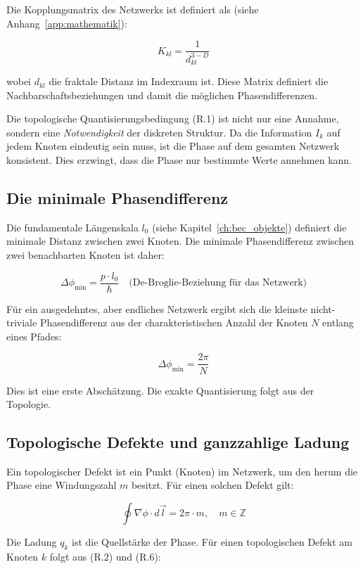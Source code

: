 Die Kopplungsmatrix des Netzwerks ist definiert als (siehe Anhang~\ref{app:mathematik}):

\[
K_{kl} = \frac{1}{d_{kl}^{3-D}}
\tag{R.3}
\]

wobei \( d_{kl} \) die fraktale Distanz im Indexraum ist. Diese Matrix definiert die Nachbarschaftsbeziehungen und damit die möglichen Phasendifferenzen.

Die topologische Quantisierungsbedingung (R.1) ist nicht nur eine Annahme, sondern eine \emph{Notwendigkeit} der diskreten Struktur. Da die Information \( I_k \) auf jedem Knoten eindeutig sein muss, ist die Phase auf dem gesamten Netzwerk konsistent. Dies erzwingt, dass die Phase nur bestimmte Werte annehmen kann.

\subsection{Die minimale Phasendifferenz}
\label{sub:phasenquantisierung_minimum}

Die fundamentale Längenskala \( l_0 \) (siehe Kapitel~\ref{ch:bec_objekte}) definiert die minimale Distanz zwischen zwei Knoten. Die minimale Phasendifferenz zwischen zwei benachbarten Knoten ist daher:

\[
\Delta \phi_{\min} = \frac{p \cdot l_0}{\hbar} \quad \text{(De-Broglie-Beziehung für das Netzwerk)}
\tag{R.4}
\]

Für ein ausgedehntes, aber endliches Netzwerk ergibt sich die kleinste nicht-triviale Phasendifferenz aus der charakteristischen Anzahl der Knoten \( N \) entlang eines Pfades:

\[
\Delta \phi_{\min} = \frac{2\pi}{N}
\tag{R.5}
\]

Dies ist eine erste Abschätzung. Die exakte Quantisierung folgt aus der Topologie.

\subsection{Topologische Defekte und ganzzahlige Ladung}
\label{sub:phasenquantisierung_defekte}

Ein topologischer Defekt ist ein Punkt (Knoten) im Netzwerk, um den herum die Phase eine Windungszahl \( m \) besitzt. Für einen solchen Defekt gilt:

\[
\oint \nabla \phi \cdot d\vec{l} = 2\pi \cdot m, \quad m \in \mathbb{Z}
\tag{R.6}
\]

Die Ladung \( q_k \) ist die Quellstärke der Phase. Für einen topologischen Defekt am Knoten \( k \) folgt aus (R.2) und (R.6):

